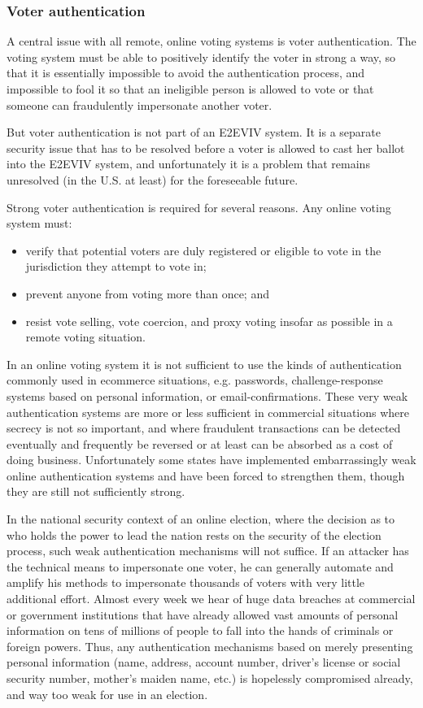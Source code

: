 \subsubsection{Voter authentication}

A central issue with all remote, online voting systems is voter
authentication. The voting system must be able to positively identify
the voter in strong a way, so that it is essentially impossible to
avoid the authentication process, and impossible to fool it so that an
ineligible person is allowed to vote or that someone can fraudulently
impersonate another voter.

But voter authentication is not part of an E2EVIV system. It is a
separate security issue that has to be resolved before a voter is
allowed to cast her ballot into the E2EVIV system, and unfortunately
it is a problem that remains unresolved (in the U.S. at least) for the
foreseeable future.

Strong voter authentication is required for several reasons. Any
online voting system must:

\begin{itemize}
\item verify that potential voters are duly registered or eligible to
  vote in the jurisdiction they attempt to vote in;
\item prevent anyone from voting more than once; and
\item resist vote selling, vote coercion, and proxy voting insofar as
  possible in a remote voting situation.
\end{itemize}

In an online voting system it is not sufficient to use the kinds of
authentication commonly used in ecommerce situations, e.g. passwords,
challenge-response systems based on personal information, or
email-confirmations. These very weak authentication systems are more
or less sufficient in commercial situations where secrecy is not so
important, and where fraudulent transactions can be detected
eventually and frequently be reversed or at least can be absorbed as a
cost of doing business. Unfortunately some states have implemented
embarrassingly weak online authentication systems and have been forced
to strengthen them, though they are still not sufficiently strong.

In the national security context of an online election, where the
decision as to who holds the power to lead the nation rests on the
security of the election process, such weak authentication mechanisms
will not suffice. If an attacker has the technical means to
impersonate one voter, he can generally automate and amplify his
methods to impersonate thousands of voters with very little additional
effort. Almost every week we hear of huge data breaches at commercial
or government institutions that have already allowed vast amounts of
personal information on tens of millions of people to fall into the
hands of criminals or foreign powers. Thus, any authentication
mechanisms based on merely presenting personal information (name,
address, account number, driver's license or social security number,
mother's maiden name, etc.) is hopelessly compromised already, and way
too weak for use in an election.

